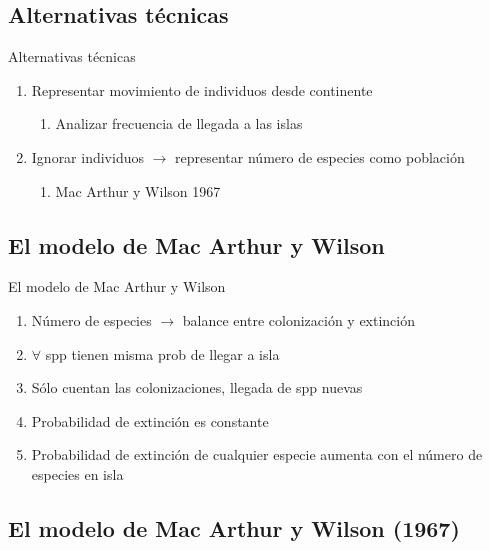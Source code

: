 \documentclass[
  11pt,
  ignorenonframetext,
]{beamer}
\providecommand{\tightlist}{%
  \setlength{\itemsep}{0pt}\setlength{\parskip}{0pt}}
\begin{document}
\hypertarget{alternativas-tuxe9cnicas}{%
\subsection{Alternativas técnicas}\label{alternativas-tuxe9cnicas}}

\begin{frame}{Alternativas técnicas}
\begin{enumerate}
\item
  Representar movimiento de individuos desde continente

  \begin{enumerate}
  \tightlist
  \item
    Analizar frecuencia de llegada a las islas
  \end{enumerate}
\item
  Ignorar individuos \(\rightarrow\) representar número de especies como
  población

  \begin{enumerate}
  \tightlist
  \item
    Mac Arthur y Wilson 1967
  \end{enumerate}
\end{enumerate}
\end{frame}

\hypertarget{el-modelo-de-mac-arthur-y-wilson}{%
\subsection{El modelo de Mac Arthur y
Wilson}\label{el-modelo-de-mac-arthur-y-wilson}}

\begin{frame}{El modelo de Mac Arthur y Wilson}
\begin{enumerate}
\item
  Número de especies \(\rightarrow\) balance entre colonización y
  extinción
\item
  \(\forall\) spp tienen misma prob de llegar a isla
\item
  Sólo cuentan las colonizaciones, llegada de spp nuevas
\item
  Probabilidad de extinción es constante
\item
  Probabilidad de extinción de cualquier especie aumenta con el número
  de especies en isla
\end{enumerate}
\end{frame}

\hypertarget{el-modelo-de-mac-arthur-y-wilson-1967}{%
\subsection{El modelo de Mac Arthur y Wilson
(1967)}\label{el-modelo-de-mac-arthur-y-wilson-1967}}
\end{document}
